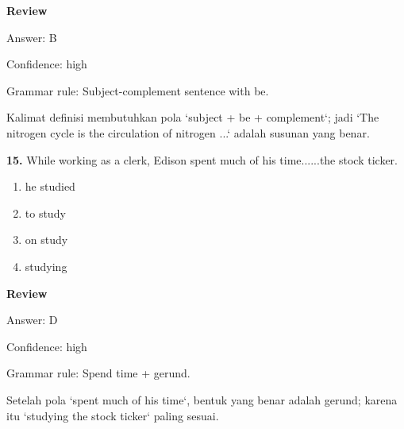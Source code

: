 \documentclass[12pt]{article}
\begin{document}
\textbf{Review}\par
Answer: B\par
Confidence: high\par
Grammar rule: Subject-complement sentence with be.\par
Kalimat definisi membutuhkan pola `subject + be + complement`; jadi `The nitrogen cycle is the circulation of nitrogen ...` adalah susunan yang benar.\par
\endgroup
\par
\vspace{0.25\baselineskip}
\noindent\textbf{15.} While working as a clerk, Edison spent much of his time......the stock ticker.
\begin{enumerate}[label=(\Alph*),leftmargin=*,itemsep=0.2em]
\item he studied
\item to study
\item on study
\item studying
\end{enumerate}
\par
\begingroup
\setlength{\parskip}{0pt}
\setlength{\parindent}{0pt}
\textbf{Review}\par
Answer: D\par
Confidence: high\par
Grammar rule: Spend time + gerund.\par
Setelah pola `spent much of his time`, bentuk yang benar adalah gerund; karena itu `studying the stock ticker` paling sesuai.\par
\endgroup
\par
\vspace{0.25\baselineskip}
\end{document}
